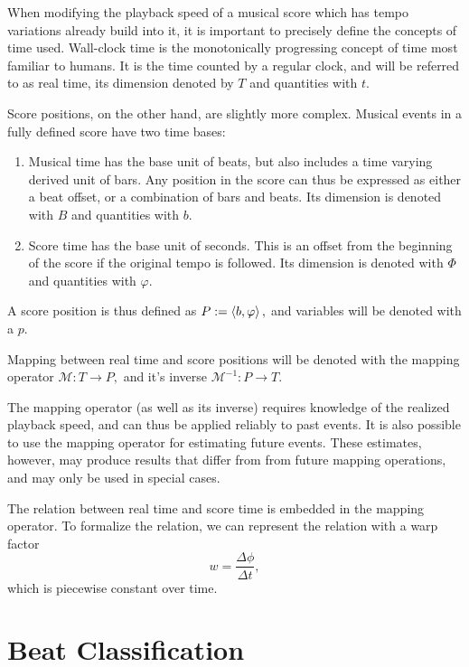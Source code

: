 When modifying the playback speed of a musical score
which has tempo variations already build into it,
it is important to precisely define the concepts of time used.
Wall-clock time is the monotonically progressing concept of time
most familiar to humans.
It is the time counted by a regular clock,
and will be referred to as real time,
its dimension denoted by $T$ and quantities with $t$.

Score positions, on the other hand,
are slightly more complex.
Musical events in a fully defined score have two time bases:
\begin{enumerate}
\item Musical time has the base unit of beats, but also includes a time varying derived unit of bars. Any position in the score can thus be expressed as either a beat offset, or a combination of bars and beats. Its dimension is denoted with $B$ and quantities with $b$.
\item Score time has the base unit of seconds. This is an offset from the beginning of the score if the original tempo is followed. Its dimension is denoted with $\Phi$ and quantities with $\varphi$.
\end{enumerate}
A score position is thus defined as
$ P := \left \langle b, \varphi \right \rangle , $
and variables will be denoted with a $p$.

Mapping between real time and score positions will be denoted with
the mapping operator
$ \mathcal{M} : T \rightarrow P, $
and it's inverse
$ \mathcal{M}^{-1} : P \rightarrow T. $

The mapping operator (as well as its inverse)
requires knowledge of
the realized playback speed,
and can thus be applied reliably to
past events.
It is also possible to use the mapping operator for
estimating future events.
These estimates, however,
may produce results that differ from
from future mapping operations,
and may only be used in special cases.

The relation between real time and score time
is embedded in the mapping operator.
To formalize the relation, we can
represent the relation with a warp factor
\begin{equation}
w = \frac{\Delta \phi}{\Delta t},
\end{equation}
which is piecewise constant over time.

\section{Beat Classification}

